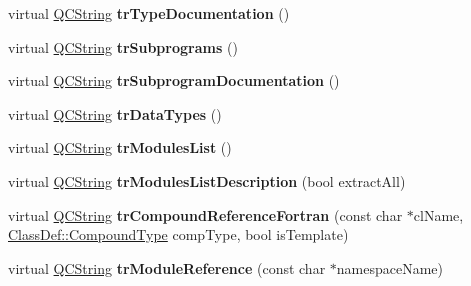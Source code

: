 \begin{DoxyCompactItemize}
virtual \mbox{\hyperlink{class_q_c_string}{Q\+C\+String}} {\bfseries tr\+Type\+Documentation} ()
\item 
\mbox{\label{class_translator_adapter__1__5__4_a76d7c1a008b8598eaf734f4991c78bff}} 
virtual \mbox{\hyperlink{class_q_c_string}{Q\+C\+String}} {\bfseries tr\+Subprograms} ()
\item 
\mbox{\label{class_translator_adapter__1__5__4_a80cffd7244cd299b0926e2db7490fabc}} 
virtual \mbox{\hyperlink{class_q_c_string}{Q\+C\+String}} {\bfseries tr\+Subprogram\+Documentation} ()
\item 
\mbox{\label{class_translator_adapter__1__5__4_aba89b913bf19d0e39e71994b506c5468}} 
virtual \mbox{\hyperlink{class_q_c_string}{Q\+C\+String}} {\bfseries tr\+Data\+Types} ()
\item 
\mbox{\label{class_translator_adapter__1__5__4_a8c578e4a7faff434305776d60bf426c2}} 
virtual \mbox{\hyperlink{class_q_c_string}{Q\+C\+String}} {\bfseries tr\+Modules\+List} ()
\item 
\mbox{\label{class_translator_adapter__1__5__4_af9c8ae97e68ad952cfecc943ef5ab5f5}} 
virtual \mbox{\hyperlink{class_q_c_string}{Q\+C\+String}} {\bfseries tr\+Modules\+List\+Description} (bool extract\+All)
\item 
\mbox{\label{class_translator_adapter__1__5__4_a6228a4426572140c72b31651e364fd62}} 
virtual \mbox{\hyperlink{class_q_c_string}{Q\+C\+String}} {\bfseries tr\+Compound\+Reference\+Fortran} (const char $\ast$cl\+Name, \mbox{\hyperlink{class_class_def_ae70cf86d35fe954a94c566fbcfc87939}{Class\+Def\+::\+Compound\+Type}} comp\+Type, bool is\+Template)
\item 
\mbox{\label{class_translator_adapter__1__5__4_ab93cc7da9a21764cb9edd29bb9a569ae}} 
virtual \mbox{\hyperlink{class_q_c_string}{Q\+C\+String}} {\bfseries tr\+Module\+Reference} (const char $\ast$namespace\+Name)
\item 
\mbox{\label{class_translator_adapter__1__5__4_aa9ce13b2c393e2b7b5f53defe2268279}} 

\end{DoxyCompactItemize}
